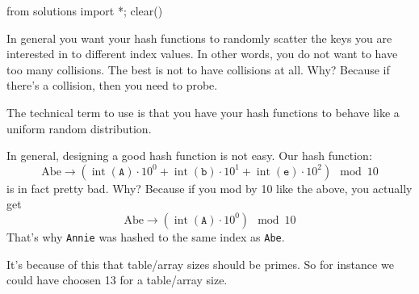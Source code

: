 \begin{python0}
from solutions import *; clear()
\end{python0}

In general you want your hash functions to randomly
scatter the keys you are interested in to different index values.
In other words, you do not want to have too many collisions.
The best is not to have collisions at all.
Why?
Because if there's a collision, then you need to probe.

The technical term to use is that you have your
hash functions to behave like a uniform random distribution.

In general, designing a good hash function is not easy.
Our hash function:
\[
\text{Abe}
\rightarrow
(\operatorname{int}(\texttt{A}) \cdot 10^0 +
\operatorname{int}(\texttt{b}) \cdot 10^1 +
\operatorname{int}(\texttt{e}) \cdot 10^2) 
\mod 10
\]
is in fact pretty bad.
Why?
Because if you mod by 10 like the above, you actually get
\[
\text{Abe}
\rightarrow
(\operatorname{int}(\texttt{A}) \cdot 10^0)
\mod 10
\]
That's why \verb!Annie! was hashed to the same index as \verb!Abe!.

It's because of this that table/array sizes should be primes.
So for instance we 
could have choosen 13 for a table/array size.




\newpage
